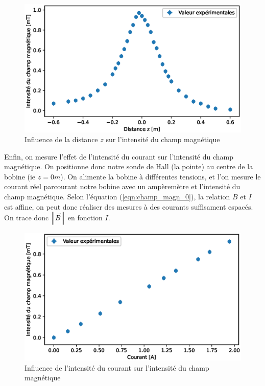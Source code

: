 \documentclass[12pt]{article}
\begin{document}
\begin{figure}[h!]
    \begin{center}
        \includegraphics[scale=0.6]{img/MagnEnFonctionDeZ.eps}
    \end{center}
    \caption{Influence de la distance $z$ sur l'intensité du champ magnétique}
\end{figure}

Enfin, on mesure l'effet de l'intensité du courant sur l'intensité du champ magnétique. On positionne donc notre
sonde de Hall (la pointe) au centre de la bobine (ie $z=0m$). On alimente la bobine à différentes tensions, et l'on mesure 
le courant réel parcourant notre bobine avec un ampèremètre et l'intensité du champ magnétique. Selon l'équation (\ref{eqn:champ_magn_0}), 
la relation $B$ et $I$ est affine, on peut donc réaliser des mesures à des courants suffisament espacés.
On trace donc $\norm{\vec{B}}$ en fonction $I$.

\begin{figure}[h!]
    \begin{center}
        \includegraphics[scale=0.6]{img/MagnEnFonctionDeI.eps}
    \end{center}
    \caption{Influence de l'intensité du courant sur l'intensité du champ magnétique}
\end{figure}
\end{document}
